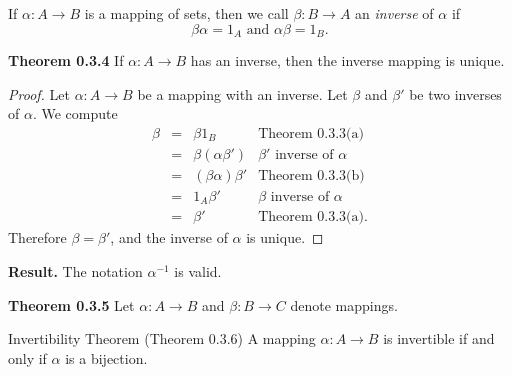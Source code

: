 \documentclass[12pt]{article}
\begin{document}
{\begin{defn}
	If $\alpha:A\to B$ is a mapping of sets, then we call $\beta:B\to A$ an \emph{inverse} of $\alpha$ if
		\[\beta\alpha = 1_A\text{ and }\alpha\beta=1_B.\]
\end{defn}

{
		\textbf{Theorem 0.3.4}
				If $\alpha:A\to B$ has an inverse, then the inverse mapping is unique.
		\begin{proof}
				Let $\alpha:A\to B$ be a mapping with an inverse.  Let $\beta$ and $\beta'$ be two inverses of $\alpha$.
				We compute
					$$\begin{array}{rcll}
							\beta &=& \beta 1_B&\text{Theorem 0.3.3(a)}\\
								 &=&\beta(\alpha\beta')&\beta'\text{ inverse of }\alpha\\
								 &=&(\beta\alpha)\beta'&\text{Theorem 0.3.3(b)}\\
								 &=&1_A\beta'&\beta\text{ inverse of }\alpha\\
								 &=&\beta'&\text{Theorem 0.3.3(a)}.
						\end{array}$$
				Therefore $\beta=\beta'$, and the inverse of $\alpha$ is unique.
			\end{proof}
		{\textbf{Result.}}
				The notation $\alpha^{-1}$ is valid.

	}
{
		\textbf{Theorem 0.3.5}
				Let $\alpha:A\to B$ and $\beta: B \to C$ denote mappings.

	}
\newpage

\begin{block}{Invertibility Theorem (Theorem 0.3.6)}
		A mapping $\alpha:A\to B$ is invertible if and only if $\alpha$ is a bijection.
	\end{block}
}
\end{document}
